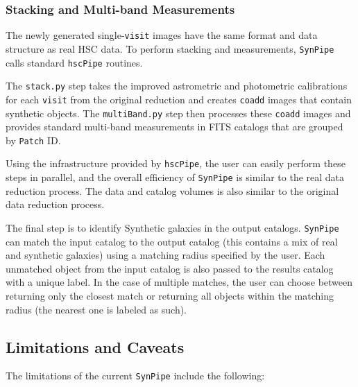 \documentclass[useamsfonts]{pasj01}
\def\hscpipe{\texttt{hscPipe}}
\def\synpipe{\texttt{SynPipe}}
\def\coadd{\texttt{coadd}}
\def\visit{\texttt{visit}}
\begin{document}
\subsubsection{Stacking and Multi-band Measurements}
    \label{sssec:multiband}

    The newly generated single-\visit{} images have the same format and data
    structure as real HSC data. To perform stacking and measurements, \synpipe{} calls 
    standard \hscpipe{} routines.
    
    The \texttt{stack.py} step takes the improved astrometric and photometric
    calibrations for each \visit{} from the original reduction and creates
    \coadd{} images that contain synthetic objects.
    The \texttt{multiBand.py} step then processes these \coadd{}  images and
    provides standard multi-band measurements in FITS catalogs that are grouped by
    \texttt{Patch} ID.

    Using the infrastructure provided by \hscpipe{}, the user can easily perform these 
    steps in parallel, and the overall efficiency of \synpipe{} is similar to
    the real data reduction process. 
    The data and catalog volumes is also similar to the original data reduction process.

    The final step is to identify Synthetic galaxies in the output catalogs. 
    \synpipe{} can match the input catalog to the output catalog (this contains a mix 
    of real and synthetic galaxies) using a matching radius specified by the user.
    Each unmatched object from the input catalog is also passed to the results catalog
    with a unique label.
    In the case of multiple matches, the user can choose between returning only the
    closest match or returning all objects within the matching radius (the nearest one
    is labeled as such).

\subsection{Limitations and Caveats}
    \label{ssec:caveats}
    
    The limitations of the current \synpipe{} include the following:
\end{document}
